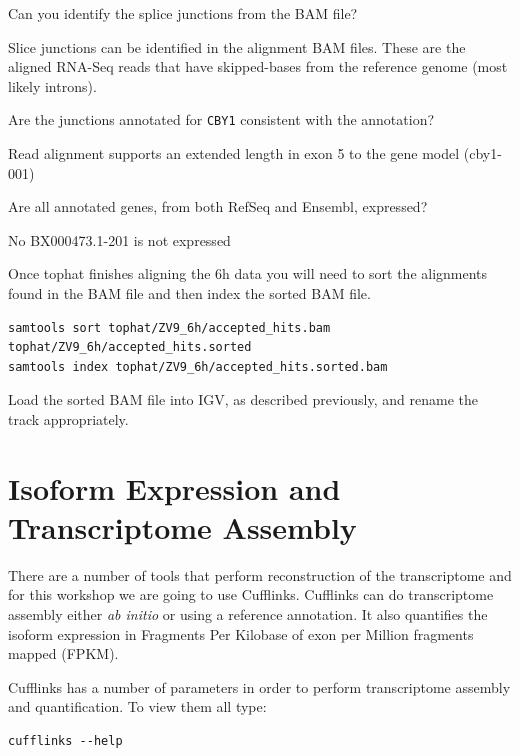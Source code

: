 \begin{questions}
Can you identify the splice junctions from the BAM file?
\begin{answer}
Slice junctions can be identified in the alignment BAM files.
These are the aligned RNA-Seq reads that have skipped-bases from the reference genome (most likely introns).
\end{answer}

Are the junctions annotated for \texttt{CBY1} consistent with the annotation?
\begin{answer}
Read alignment supports an extended length in exon 5 to the gene model (cby1-001) 
\end{answer}

Are all annotated genes, from both RefSeq and Ensembl, expressed?
\begin{answer}
No BX000473.1-201 is not expressed
\end{answer}

\end{questions}

\begin{steps}
Once tophat finishes aligning the 6h data you will need to sort the alignments found in the BAM file and then index the
sorted BAM file.

\begin{lstlisting}
samtools sort tophat/ZV9_6h/accepted_hits.bam tophat/ZV9_6h/accepted_hits.sorted
samtools index tophat/ZV9_6h/accepted_hits.sorted.bam
\end{lstlisting}

Load the sorted BAM file into IGV, as described previously, and rename the track appropriately.
\end{steps}

\newpage
\section{Isoform Expression and Transcriptome Assembly}
There are a number of tools that perform reconstruction of the transcriptome
and for this workshop we are going to use Cufflinks. Cufflinks can do
transcriptome assembly either \textit{ab initio} or using a reference annotation. It
also quantifies the isoform expression in Fragments
Per Kilobase of exon per Million fragments mapped (FPKM).

\begin{steps}
Cufflinks has a number of parameters in order to perform transcriptome
assembly and quantification. To view them all type:

\begin{lstlisting}
cufflinks --help
\end{lstlisting}
\end{steps}

